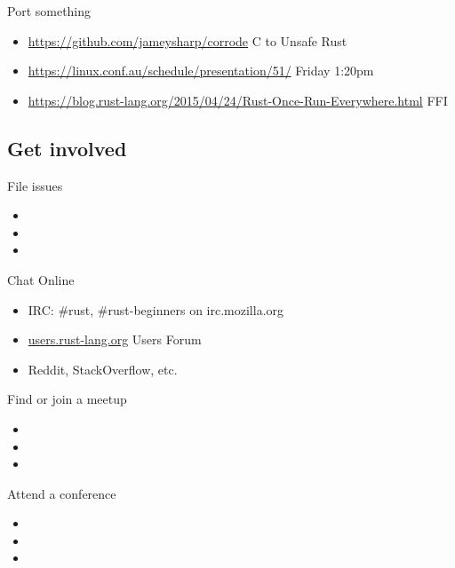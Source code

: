 \documentclass[50pt]{beamer}
\begin{document}
    \begin{frame}
        Port something
        \begin{itemize}
            \item \url{https://github.com/jameysharp/corrode} C to Unsafe Rust
            \item \url{https://linux.conf.au/schedule/presentation/51/} Friday 1:20pm
            \item \url{https://blog.rust-lang.org/2015/04/24/Rust-Once-Run-Everywhere.html} FFI
        \end{itemize}
    \end{frame}


\subsection{Get involved}

    \begin{frame}
        File issues
        \begin{itemize}
            \item
            \item
            \item
        \end{itemize}
    \end{frame}

    \begin{frame}
        Chat Online
        \begin{itemize}
            \item IRC: \#rust, \#rust-beginners on irc.mozilla.org
            \item \url{users.rust-lang.org} Users Forum
            \item Reddit, StackOverflow, etc.
        \end{itemize}
    \end{frame}

    \begin{frame}
        Find or join a meetup
        \begin{itemize}
            \item
            \item
            \item
        \end{itemize}
    \end{frame}

    \begin{frame}
        Attend a conference
        \begin{itemize}
            \item
            \item
            \item
        \end{itemize}
    \end{frame}
\end{document}

